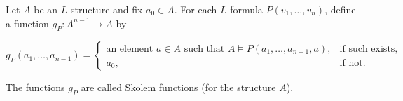 Let $A$ be an $L$-structure and fix $a_0 \in A$. For each $L$-formula $P(v_1, \ldots, v_n)$, define a function $g_P : A^{n-1} \to A$ by

$$g_P(a_1, \ldots, a_{n-1}) = \begin{cases}
\text{an element } a \in A \text{ such that } A \models P(a_1, \ldots, a_{n-1}, a), & \text{if such exists,} \\
a_0, & \text{if not.}
\end{cases}$$

The functions $g_P$ are called Skolem functions (for the structure $A$).
